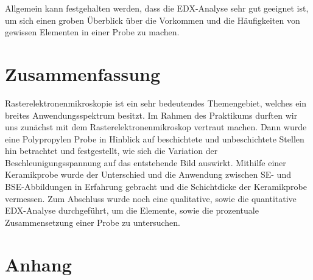 \documentclass[12pt,english,ngerman]{scrartcl}
\begin{document}
Allgemein kann festgehalten werden, dass die EDX-Analyse sehr gut geeignet ist,
um sich einen groben Überblick über die Vorkommen und die Häufigkeiten von
gewissen Elementen in einer Probe zu machen.

\section{Zusammenfassung}

Rasterelektronenmikroskopie ist ein sehr bedeutendes Themengebiet, welches ein
breites Anwendungsspektrum besitzt. Im Rahmen des Praktikums durften wir uns
zunächst mit dem Rasterelektronenmikroskop vertraut machen. Dann wurde eine
Polypropylen Probe in Hinblick auf beschichtete und unbeschichtete Stellen hin
betrachtet und festgestellt, wie sich die Variation der Beschleunigungsspannung
auf das entstehende Bild auswirkt. Mithilfe einer Keramikprobe wurde der
Unterschied und die Anwendung zwischen SE- und BSE-Abbildungen in Erfahrung
gebracht und die Schichtdicke der Keramikprobe vermessen. Zum Abschluss wurde
noch eine qualitative, sowie die quantitative EDX-Analyse durchgeführt, um die
Elemente, sowie die prozentuale Zusammensetzung einer Probe zu untersuchen.

\section{Anhang}



\newpage

\printbibliography{}
\end{document}
